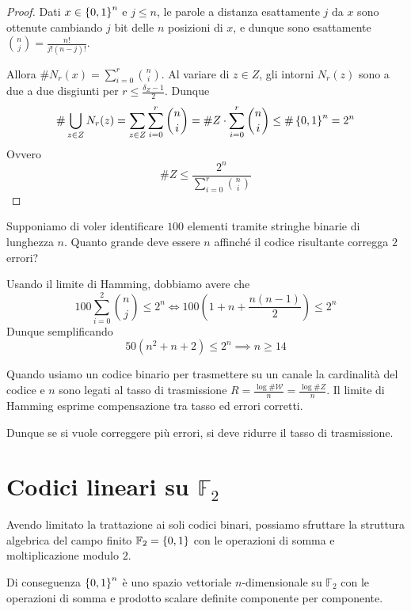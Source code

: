\begin{proof}
  Dati \(x \in \set{0,1}^n\) e \(j\leq n\), le parole a distanza esattamente \(j\) da \(x\) sono ottenute cambiando \(j\) bit delle \(n\) posizioni di \(x\), e dunque sono esattamente \({n \choose j} = \frac{n!}{j!(n-j)!}\).

  Allora \(\#N_r(x) = \sum_{i=0}^r {n \choose i}\). Al variare di \(z \in Z\), gli intorni \(N_r(z)\) sono a due a due disgiunti per \(r \leq \frac{\delta_Z - 1}{2}\).
  Dunque 
  \[\#\bigcup_{z\in Z} N_r(z)= \sum_{z\in Z} \sum_{i=0}^r {n \choose i} = \#Z \cdot \sum_{i=0}^r {n \choose i}\leq \# \set{0,1}^n = 2^n\]
  Ovvero \[\# Z \leq \frac{2^n}{\sum_{i=0}^r {n \choose i}}\] 
\end{proof}

\begin{example}{}
  Supponiamo di voler identificare \(100\) elementi tramite stringhe binarie di lunghezza \(n\). Quanto grande deve essere \(n\) affinché il codice risultante corregga \(2\) errori?

  Usando il limite di Hamming, dobbiamo avere che
  \[100 \sum_{i=0}^2{n \choose j} \leq  2^n \iff 100 (1+n+\frac{n(n-1)}{2})\leq 2^n\]
  Dunque semplificando
  \[50(n^2+n+2)\leq 2^n \implies n \geq 14\]
\end{example}

\begin{observation}{}
  Quando usiamo un codice binario per trasmettere su un canale la cardinalità del codice e \(n\) sono legati al tasso di trasmissione \(R = \frac{\log \#\mathcal{W}}{n} = \frac{\log \#Z}{n}\).
  Il limite di Hamming esprime compensazione tra tasso ed errori corretti.

  Dunque se si vuole correggere più errori, si deve ridurre il tasso di trasmissione.
\end{observation}

\section{Codici lineari su \(\mathbb{F}_2\)}

Avendo limitato la trattazione ai soli codici binari, possiamo sfruttare la struttura algebrica del campo finito \(\mathbb{F}_2 = \set{0,1}\) con le operazioni di somma e moltiplicazione modulo \(2\).

Di conseguenza \(\set{0,1}^n\) è uno spazio vettoriale \(n\)-dimensionale su \(\mathbb{F}_2\) con le operazioni di somma e prodotto scalare definite componente per componente.


